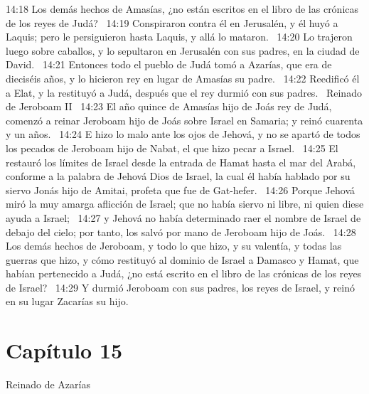 14:18 Los demás hechos de Amasías, ¿no están escritos en el libro de las crónicas de los reyes de Judá?  
14:19 Conspiraron contra él en Jerusalén, y él huyó a Laquis; pero le persiguieron hasta Laquis, y allá lo mataron.  
14:20 Lo trajeron luego sobre caballos, y lo sepultaron en Jerusalén con sus padres, en la ciudad de David.  
14:21 Entonces todo el pueblo de Judá tomó a Azarías, que era de dieciséis años, y lo hicieron rey en lugar de Amasías su padre.  
14:22 Reedificó él a Elat, y la restituyó a Judá, después que el rey durmió con sus padres.  
Reinado de Jeroboam II  
14:23 El año quince de Amasías hijo de Joás rey de Judá, comenzó a reinar Jeroboam hijo de Joás sobre Israel en Samaria; y reinó cuarenta y un años.  
14:24 E hizo lo malo ante los ojos de Jehová, y no se apartó de todos los pecados de Jeroboam hijo de Nabat, el que hizo pecar a Israel.  
14:25 El restauró los límites de Israel desde la entrada de Hamat hasta el mar del Arabá, conforme a la palabra de Jehová Dios de Israel, la cual él había hablado por su siervo Jonás hijo de Amitai, profeta que fue de Gat-hefer.  
14:26 Porque Jehová miró la muy amarga aflicción de Israel; que no había siervo ni libre, ni quien diese ayuda a Israel;  
14:27 y Jehová no había determinado raer el nombre de Israel de debajo del cielo; por tanto, los salvó por mano de Jeroboam hijo de Joás.  
14:28 Los demás hechos de Jeroboam, y todo lo que hizo, y su valentía, y todas las guerras que hizo, y cómo restituyó al dominio de Israel a Damasco y Hamat, que habían pertenecido a Judá, ¿no está escrito en el libro de las crónicas de los reyes de Israel?  
14:29 Y durmió Jeroboam con sus padres, los reyes de Israel, y reinó en su lugar Zacarías su hijo.  
\section*{Capítulo 15 }
Reinado de Azarías  


